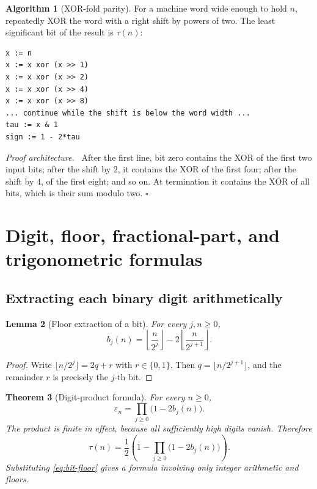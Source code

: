 \documentclass[11pt,oneside]{article}
\newtheorem{theorem}{Theorem}[section]
\newtheorem{lemma}[theorem]{Lemma}
\theoremstyle{definition}
\newtheorem{algorithm}[theorem]{Algorithm}
\theoremstyle{remark}
\newcommand{\eps}{\varepsilon}
\newcommand{\1}{\mathbf 1}
\newenvironment{proofidea}{\par\smallskip\noindent\textit{Proof architecture.}\ }{\hfill$\square$\par\smallskip}
\begin{document}
\begin{algorithm}[XOR-fold parity]
\label{alg:xor-fold}
For a machine word wide enough to hold \(n\), repeatedly XOR the word with a right shift by
powers of two.  The least significant bit of the result is \(\tau(n)\):
\begin{lstlisting}[style=pseudo]
x := n
x := x xor (x >> 1)
x := x xor (x >> 2)
x := x xor (x >> 4)
x := x xor (x >> 8)
... continue while the shift is below the word width ...
tau := x & 1
sign := 1 - 2*tau
\end{lstlisting}
\end{algorithm}

\begin{proofidea}
After the first line, bit zero contains the XOR of the first two input bits; after the shift by
\(2\), it contains the XOR of the first four; after the shift by \(4\), of the first eight;
and so on.  At termination it contains the XOR of all bits, which is their sum modulo two.
\end{proofidea}

\section{Digit, floor, fractional-part, and trigonometric formulas}
\label{sec:digits}

\subsection{Extracting each binary digit arithmetically}

\begin{lemma}[Floor extraction of a bit]
\label{lem:bit-floor}
For every \(j,n\ge0\),
\begin{equation}
 b_j(n)=\left\lfloor\frac{n}{2^j}\right\rfloor
       -2\left\lfloor\frac{n}{2^{j+1}}\right\rfloor.
 \label{eq:bit-floor}
\end{equation}
\end{lemma}

\begin{proof}
Write \(\lfloor n/2^j\rfloor=2q+r\) with \(r\in\{0,1\}\).  Then
\(q=\lfloor n/2^{j+1}\rfloor\), and the remainder \(r\) is precisely the \(j\)-th bit.
\end{proof}

\begin{theorem}[Digit-product formula]
\label{thm:digit-product}
For every \(n\ge0\),
\begin{equation}
 \boxed{\eps_n=\prod_{j\ge0}\bigl(1-2b_j(n)\bigr)}.
 \label{eq:digit-product}
\end{equation}
The product is finite in effect, because all sufficiently high digits vanish.  Therefore
\begin{equation}
 \tau(n)=\frac12\left(1-\prod_{j\ge0}\bigl(1-2b_j(n)\bigr)\right).
 \label{eq:tau-digit-product}
\end{equation}
Substituting \eqref{eq:bit-floor} gives a formula involving only integer arithmetic and floors.
\end{theorem}
\end{document}

